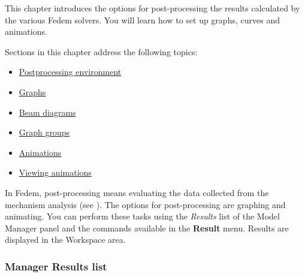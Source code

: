 %
%

%
%


This chapter introduces the options for post-processing the results
calculated by the various Fedem solvers.
You will learn how to set up graphs, curves and animations.

Sections in this chapter address the following topics:

\begin{itemize}
\item
  \protect\hyperlink{postprocessing-environment}
                    {Postprocessing environment}
\item
  \protect\hyperlink{graphs}
                    {Graphs}
\item
  \protect\hyperlink{beam-diagrams}
                    {Beam diagrams}
\item
  \protect\hyperlink{graph-groups}
                    {Graph groups}
\item
  \protect\hyperlink{animations}
                    {Animations}
\item
  \protect\hyperlink{viewing-animations}
                    {Viewing animations}
\end{itemize}

\clearpage



In Fedem, post-processing means evaluating the data collected from the mechanism
analysis (see ).
The options for post-processing are graphing and animating.
You can perform these tasks using the {\sl Results} list of the Model Manager
panel and the commands available in the \textbf{Result} menu.
Results are displayed in the Workspace area.

\medskip
\subsubsection{Manager Results list}

